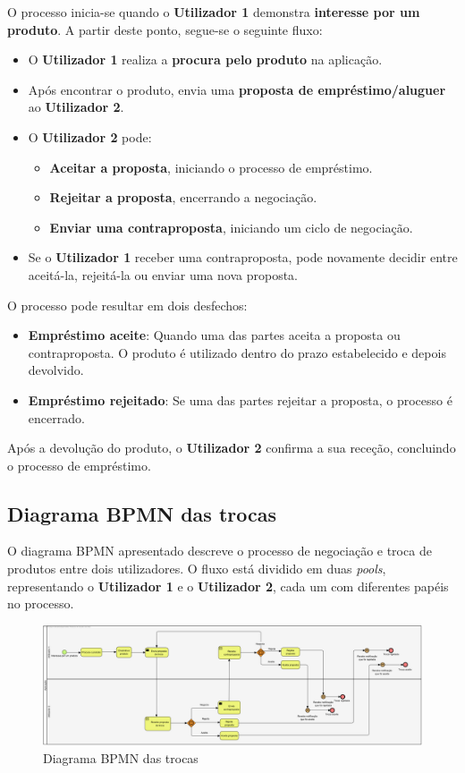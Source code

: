\documentclass[a4paper, 12pt]{article} %
\begin{document}
O processo inicia-se quando o \textbf{Utilizador 1} demonstra \textbf{interesse por um produto}. A partir deste ponto, segue-se o seguinte fluxo:

\begin{itemize}
	\item O \textbf{Utilizador 1} realiza a \textbf{procura pelo produto} na aplicação.
	\item Após encontrar o produto, envia uma \textbf{proposta de empréstimo/aluguer} ao \textbf{Utilizador 2}.
	\item O \textbf{Utilizador 2} pode:
	\begin{itemize}
		\item \textbf{Aceitar a proposta}, iniciando o processo de empréstimo.
		\item \textbf{Rejeitar a proposta}, encerrando a negociação.
		\item \textbf{Enviar uma contraproposta}, iniciando um ciclo de negociação.
	\end{itemize}
	\item Se o \textbf{Utilizador 1} receber uma contraproposta, pode novamente decidir entre aceitá-la, rejeitá-la ou enviar uma nova proposta.
\end{itemize}

O processo pode resultar em dois desfechos:
\begin{itemize}
	\item \textbf{Empréstimo aceite}: Quando uma das partes aceita a proposta ou contraproposta. O produto é utilizado dentro do prazo estabelecido e depois devolvido.
	\item \textbf{Empréstimo rejeitado}: Se uma das partes rejeitar a proposta, o processo é encerrado.
\end{itemize}

Após a devolução do produto, o \textbf{Utilizador 2} confirma a sua receção, concluindo o processo de empréstimo.

\subsection{Diagrama BPMN das trocas}

O diagrama BPMN apresentado descreve o processo de negociação e troca de produtos entre dois utilizadores. O fluxo está dividido em duas \textit{pools}, representando o \textbf{Utilizador 1} e o \textbf{Utilizador 2}, cada um com diferentes papéis no processo.

\begin{figure}[ht]
	\centering
	\includegraphics[width=\textwidth]{../images/bpmn-swaps.png}
	\caption{Diagrama BPMN das trocas}
	\label{fig:bpmn trocas}
\end{figure}
\end{document}
